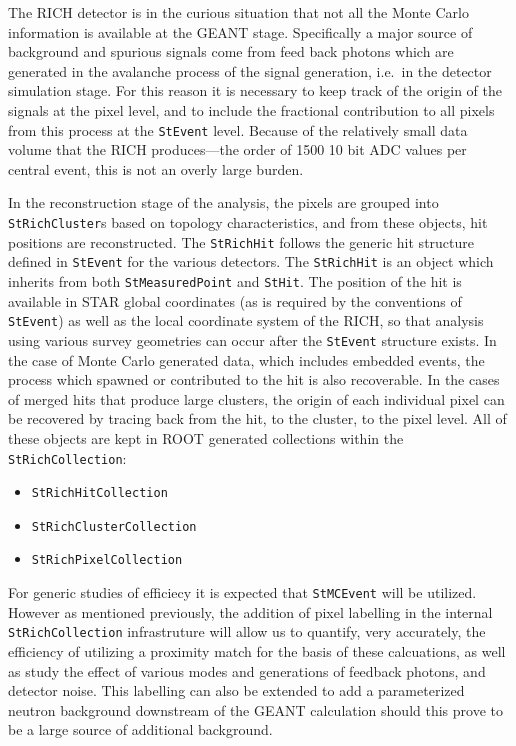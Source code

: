 \documentclass[twoside]{article}
\begin{document}
The RICH detector is in the curious situation that not all the
Monte Carlo information is available at the GEANT stage.  Specifically
a major source of background and spurious signals come from feed
back photons which are generated in the avalanche process of the
signal generation, i.e.~in
the detector simulation stage.  For this reason it is necessary
to keep track of the origin of the signals at the pixel level,
and to include the fractional contribution to all pixels from this
process at the \texttt{StEvent} level.  Because
of the relatively small data volume that the RICH produces---the order
of 1500 10 bit ADC values per central event, this is not an
overly large burden.

In the reconstruction stage of the analysis, the pixels are grouped
into \texttt{StRichCluster}s based on topology characteristics,
and from these objects, hit positions are reconstructed.
The \texttt{StRichHit}
follows the generic hit structure defined in \texttt{StEvent} for
the various detectors.  The \texttt{StRichHit} is an object
which inherits from both \texttt{StMeasuredPoint} and
\texttt{StHit}.  The position of the hit is available in STAR global
coordinates (as is required by the conventions of \texttt{StEvent})
as well as the local coordinate system of the RICH, so that analysis
using various survey geometries can occur after the \texttt{StEvent}
structure exists.  In the case of Monte Carlo generated data, which
includes embedded events, the process which spawned or contributed to
the hit is also recoverable.  In the cases of merged hits that produce
large clusters, the origin of each individual pixel can be recovered
by tracing back from the hit, to the cluster, to the pixel level.
All of these objects are kept in ROOT generated collections within
the \texttt{StRichCollection}:
\begin{itemize}
    \item \texttt{StRichHitCollection}
    \item \texttt{StRichClusterCollection}
    \item \texttt{StRichPixelCollection}
\end{itemize}
For generic studies of efficiecy
it is expected that \texttt{StMCEvent} will be utilized.  However as
mentioned previously, the addition
of pixel labelling in the internal \texttt{StRichCollection} infrastruture
will allow us to quantify, very accurately, the efficiency of utilizing
a proximity match for the basis of these calcuations, as well as study
the effect of various modes and generations of feedback photons, and
detector noise.  This labelling can also be extended to add a
parameterized neutron
background downstream of the GEANT calculation should this prove to
be a large source of additional background.
\end{document}
